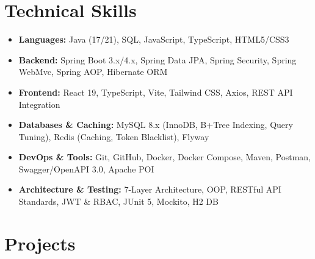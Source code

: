 ﻿\documentclass[10pt,a4paper]{article}
\begin{document}
\section{Technical Skills}
\begin{itemize}[leftmargin=1.2em, itemsep=1.8pt, topsep=2pt]
    \item \textbf{Languages:} Java (17/21), SQL, JavaScript, TypeScript, HTML5/CSS3
    \item \textbf{Backend:} Spring Boot 3.x/4.x, Spring Data JPA, Spring Security, Spring WebMvc, Spring AOP, Hibernate ORM
    \item \textbf{Frontend:} React 19, TypeScript, Vite, Tailwind CSS, Axios, REST API Integration
    \item \textbf{Databases \& Caching:} MySQL 8.x (InnoDB, B+Tree Indexing, Query Tuning), Redis (Caching, Token Blacklist), Flyway
    \item \textbf{DevOps \& Tools:} Git, GitHub, Docker, Docker Compose, Maven, Postman, Swagger/OpenAPI 3.0, Apache POI
    \item \textbf{Architecture \& Testing:} 7-Layer Architecture, OOP, RESTful API Standards, JWT \& RBAC, JUnit 5, Mockito, H2 DB
\end{itemize}

\section{Projects}
\end{document}
